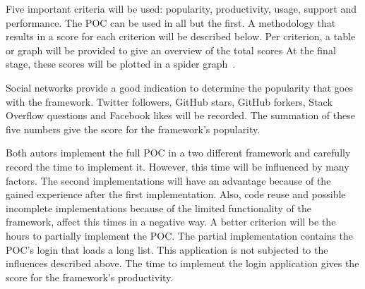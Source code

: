 \documentclass[a4paper]{artikel3}
\newcommand{\setspace}[0]{\vspace{2mm}}
\renewcommand{\paragraph}[1]{\setspace \noindent {\bf #1}  }
\begin{document}
Five important criteria will be used:  popularity,  productivity,  usage,  support and performance. 
The POC can be used in all but the first.   
A methodology that results in a score for each criterion will be described below.  
Per criterion,  a table or graph will be provided to give an overview of the total scores
At the final stage,  these scores will be plotted in a spider graph~\cite{Few2005}.   

\paragraph{Popularity}
Social networks provide a good indication to determine the popularity that goes with the framework.  
Twitter followers,  GitHub stars,  GitHub forkers,  Stack Overflow questions and Facebook likes will be recorded.
The summation of these five numbers give the score for the framework's popularity.  


\paragraph{Productivity}
Both autors implement the full POC in a two different framework and carefully record the time to implement it.  
However,  this time will be influenced by many factors.
The second implementations will have an advantage because of the gained experience after the first implementation.
Also,  code reuse and possible incomplete implementations because of the limited functionality of the framework, affect this times in a negative way.
A better criterion will be the hours to partially implement the POC.  
The partial implementation contains the POC's login that loads a long list.
This application is not subjected to the influences described above. %
The time to implement the login application gives the score for the framework's productivity. 
\end{document}
